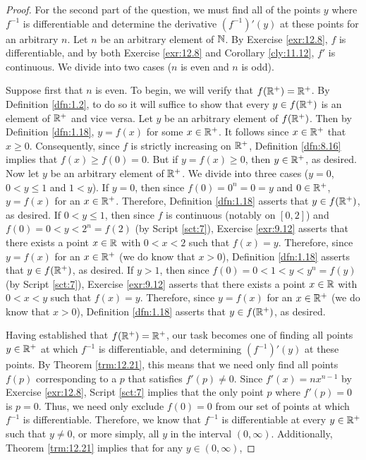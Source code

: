 \documentclass[../main.tex]{subfiles}
\begin{document}
\begin{exercise}
\begin{proof}
        For the second part of the question, we must find all of the points $y$ where $f^{-1}$ is differentiable and determine the derivative $(f^{-1})'(y)$ at these points for an arbitrary $n$. Let $n$ be an arbitrary element of $\mathbb{N}$. By Exercise \ref{exr:12.8}, $f$ is differentiable, and by both Exercise \ref{exr:12.8} and Corollary \ref{cly:11.12}, $f'$ is continuous. We divide into two cases ($n$ is even and $n$ is odd).\par\smallskip
        Suppose first that $n$ is even. To begin, we will verify that $f(\mathbb{R}^+)=\mathbb{R}^+$. By Definition \ref{dfn:1.2}, to do so it will suffice to show that every $y\in f(\mathbb{R}^+)$ is an element of $\mathbb{R}^+$ and vice versa. Let $y$ be an arbitrary element of $f(\mathbb{R}^+)$. Then by Definition \ref{dfn:1.18}, $y=f(x)$ for some $x\in\mathbb{R}^+$. It follows since $x\in\mathbb{R}^+$ that $x\geq 0$. Consequently, since $f$ is strictly increasing on $\mathbb{R}^+$, Definition \ref{dfn:8.16} implies that $f(x)\geq f(0)=0$. But if $y=f(x)\geq 0$, then $y\in\mathbb{R}^+$, as desired. Now let $y$ be an arbitrary element of $\mathbb{R}^+$. We divide into three cases ($y=0$, $0<y\leq 1$ and $1<y$). If $y=0$, then since $f(0)=0^n=0=y$ and $0\in\mathbb{R}^+$, $y=f(x)$ for an $x\in\mathbb{R}^+$. Therefore, Definition \ref{dfn:1.18} asserts that $y\in f(\mathbb{R}^+)$, as desired. If $0<y\leq 1$, then since $f$ is continuous (notably on $[0,2]$) and $f(0)=0<y<2^n=f(2)$ (by Script \ref{sct:7}), Exercise \ref{exr:9.12} asserts that there exists a point $x\in\mathbb{R}$ with $0<x<2$ such that $f(x)=y$. Therefore, since $y=f(x)$ for an $x\in\mathbb{R}^+$ (we do know that $x>0$), Definition \ref{dfn:1.18} asserts that $y\in f(\mathbb{R}^+)$, as desired. If $y>1$, then since $f(0)=0<1<y<y^n=f(y)$ (by Script \ref{sct:7}), Exercise \ref{exr:9.12} asserts that there exists a point $x\in\mathbb{R}$ with $0<x<y$ such that $f(x)=y$. Therefore, since $y=f(x)$ for an $x\in\mathbb{R}^+$ (we do know that $x>0$), Definition \ref{dfn:1.18} asserts that $y\in f(\mathbb{R}^+)$, as desired.\par
        Having established that $f(\mathbb{R}^+)=\mathbb{R}^+$, our task becomes one of finding all points $y\in\mathbb{R}^+$ at which $f^{-1}$ is differentiable, and determining $(f^{-1})'(y)$ at these points. By Theorem \ref{trm:12.21}, this means that we need only find all points $f(p)$ corresponding to a $p$ that satisfies $f'(p)\neq 0$. Since $f'(x)=nx^{n-1}$ by Exercise \ref{exr:12.8}, Script \ref{sct:7} implies that the only point $p$ where $f'(p)=0$ is $p=0$. Thus, we need only exclude $f(0)=0$ from our set of points at which $f^{-1}$ is differentiable. Therefore, we know that $f^{-1}$ is differentiable at every $y\in\mathbb{R}^+$ such that $y\neq 0$, or more simply, all $y$ in the interval $(0,\infty)$. Additionally, Theorem \ref{trm:12.21} implies that for any $y\in(0,\infty)$,

\end{proof}
\end{exercise}
\end{document}

